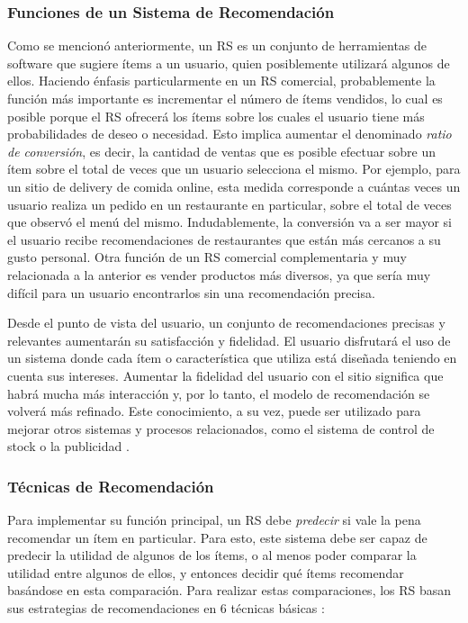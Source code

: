 \subsubsection{Funciones de un Sistema de Recomendación}
Como se mencionó anteriormente, un RS es un conjunto de herramientas de software que sugiere ítems a un usuario, quien posiblemente utilizará algunos de ellos. Haciendo énfasis particularmente en un RS comercial, probablemente la función más importante es incrementar el número de ítems vendidos, lo cual es posible porque el RS ofrecerá los ítems sobre los cuales el usuario tiene más probabilidades de deseo o necesidad. Esto implica aumentar el denominado \textit{ratio de conversión}, es decir, la cantidad de ventas que es posible efectuar sobre un ítem sobre el total de veces que un usuario selecciona el mismo. Por ejemplo, para un sitio de delivery de comida online, esta medida corresponde a cuántas veces un usuario realiza un pedido en un restaurante en particular, sobre el total de veces que observó el menú del mismo. Indudablemente, la conversión va a ser mayor si el usuario recibe recomendaciones de restaurantes que están más cercanos a su gusto personal. Otra función de un RS comercial complementaria y muy relacionada a la anterior es vender productos más diversos, ya que sería muy difícil para un usuario encontrarlos sin una recomendación precisa.

\bigskip Desde el punto de vista del usuario, un conjunto de recomendaciones precisas y relevantes aumentarán su satisfacción y fidelidad. El usuario disfrutará el uso de un sistema donde cada ítem o característica que utiliza está diseñada teniendo en cuenta sus intereses. Aumentar la fidelidad del usuario con el sitio significa que habrá mucha más interacción y, por lo tanto, el modelo de recomendación se volverá más refinado. Este conocimiento, a su vez, puede ser utilizado para mejorar otros sistemas y procesos relacionados, como el sistema de control de stock o la publicidad \citep{ricci2011introduction}.

\subsubsection{Técnicas de Recomendación}
Para implementar su función principal, un RS debe \textit{predecir} si vale la pena recomendar un ítem en particular. Para esto, este sistema debe ser capaz de predecir la utilidad de algunos de los ítems, o al menos poder comparar la utilidad entre algunos de ellos, y entonces decidir qué ítems recomendar basándose en esta comparación. Para realizar estas comparaciones, los RS basan sus estrategias de recomendaciones en 6 técnicas básicas \citep{ricci2011introduction}:

